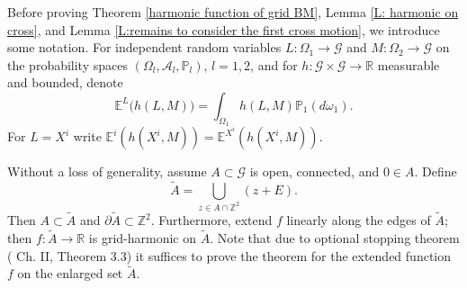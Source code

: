 \documentclass[11pt]{article}
\makeatletter
\renewenvironment{proof}[1][\proofname]{
   \par\pushQED{\qed}\normalfont
   \topsep6\p@\@plus6\p@\relax
   \trivlist\item[\hskip\labelsep\bfseries#1\@addpunct{.}]
   \ignorespaces
}{
   \popQED\endtrivlist\@endpefalse
}
\numberwithin{equation}{section}
\def\Ex{\mathbb{E}}
\makeatother
\begin{document}
Before proving Theorem \ref{harmonic function of grid BM}, 
Lemma \ref{L: harmonic on cross}, and
Lemma \ref{L:remains to consider the first cross motion},
we introduce some notation. For independent random variables 
$L : \Omega_1 \rightarrow \mathcal{G}$
and 
$M : \Omega_2 \rightarrow \mathcal{G}$
on the probability spaces 
$(\Omega_l, \mathcal{A}_l, \mathbb{P}_l)$, 
$l = 1,2$, and for 
$h: \mathcal{G} \times \mathcal{G} 
\rightarrow \mathbb{R}$ measurable and bounded, denote
\begin{equation}\nonumber
  \Ex^{L}\big(h(L,M) \big) = 
  \int_{\Omega_1} h(L,M) \mathbb{P}_1(d\omega_1).
\end{equation}
For $L=X^i$ write $\Ex^i(h(X^i,M)) = \Ex^{X^i}(h(X^i,M))$.

\begin{proof}[Proof of Theorem \ref{harmonic function of grid BM}]
  Without a loss of generality, 
  assume $A \subset \mathcal{G}$ is open, connected, and $0 \in A$. 
  Define 
  \begin{equation}\nonumber 
    \tilde{A} = \bigcup_{z \in A \cap \mathbb{Z}^2}
                    (z+E).
  \end{equation}
  Then $A \subset \tilde{A}$ 
  and $\partial \tilde{A} \subset \mathbb{Z}^2$. 
  Furthermore, extend $f$ linearly along the edges of $\tilde{A}$;
  then $f : \tilde{A} \rightarrow \mathbb{R}$ is grid-harmonic on $\tilde{A}$. 
  Note that due to optional stopping theorem \hbox{(\cite{revuz}} Ch. II, Theorem 3.3)
  it suffices to prove the theorem for 
  the extended function $f$ on the enlarged set $\tilde{A}$.


\end{proof}
\end{document}
